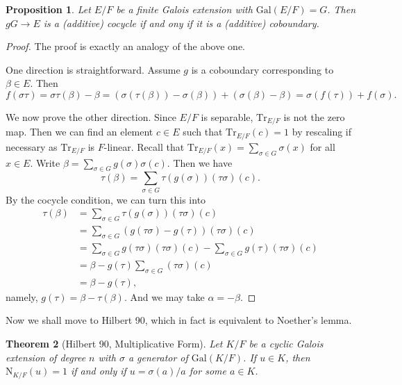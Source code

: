 \documentclass[12pt]{report}
\newtheorem{theorem}{Theorem}[section]
\newtheorem{proposition}[theorem]{Proposition}
{\theoremstyle{remark}\newtheorem*{remark}{Remark}}
\theoremstyle{definition}
\newcommand{\Gal}{\text{Gal}}
\newcommand{\Tr}{\text{Tr}}
\newcommand{\nm}{\text{N}}
\begin{document}
\begin{proposition}
	Let $E/F$ be a finite Galois extension with $\Gal(E/F)=G$. Then $g G\to E$ is a (additive) cocycle if and ony if it is a (additive) coboundary.
\end{proposition}

\begin{proof}
	The proof is exactly an analogy of the above one.

	One direction is straightforward. Assume $g$ is a coboundary corresponding to $\beta\in E$. Then
	$$f(\sigma\tau)=\sigma\tau(\beta)-\beta =(\sigma(\tau(\beta))-\sigma(\beta))+(\sigma(\beta)-\beta)=\sigma(f(\tau))+ f(\sigma).$$


	We now prove the other direction. Since $E/F$ is separable, $\Tr_{E/F}$ is not the zero map. Then we can find an element $c\in E$ such that $\Tr_{E/F}(c)=1$ by rescaling if necessary as $\Tr_{E/F}$ is $F$-linear. Recall that $\Tr_{E/F}(x)=\sum_{\sigma\in G}\sigma(x)$ for all $x\in E$. Write $\beta=\sum_{\sigma\in G}g(\sigma)\sigma(c)$. Then we have $$\tau(\beta)=\sum_{\sigma\in G}\tau(g(\sigma))(\tau\sigma)(c).$$ By the cocycle condition, we can turn this into
	\begin{align*}
		\tau(\beta) & =\sum_{\sigma\in G}\tau(g(\sigma))(\tau\sigma)(c)                                        \\
		            & =\sum_{\sigma\in G}(g(\tau\sigma)-g(\tau))(\tau\sigma)(c)                                \\
		            & =\sum_{\sigma\in G}g(\tau\sigma)(\tau\sigma)(c)-\sum_{\sigma\in G}g(\tau)(\tau\sigma)(c) \\
		            & =\beta-g(\tau)\sum_{\sigma\in G}(\tau\sigma)(c)                                          \\
		            & = \beta-g(\tau),
	\end{align*}
	namely, $g(\tau)=\beta-\tau(\beta)$. And we may take $\alpha=-\beta$.
\end{proof}

Now we shall move to Hilbert 90, which in fact is equivalent to Noether's lemma.

\begin{theorem}[Hilbert 90, Multiplicative Form]
	Let $K/F$ be a cyclic Galois extension of degree $n$ with $\sigma$ a generator of $\Gal(K/F)$. If $u\in K$, then $\nm_{K/F}(u)=1$ if and only if $u=\sigma(a)/a$ for some $a\in K$.
\end{theorem}
\end{document}
